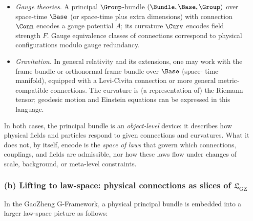 \documentclass[11pt]{book}
\theoremstyle{plain}
\theoremstyle{definition}
\newcommand{\GZLS}{\ensuremath{\mathfrak{L}_{\mathrm{GZ}}}}       \newcommand{\GZLT}{\ensuremath{M_{!w}}}                           \newcommand{\GZLOC}{\ensuremath{A_M}}                             \newcommand{\GZLCurv}{\ensuremath{\mathcal{F}_{\mathrm{law}}}}
\begin{document}
\begin{itemize}
  \item \emph{Gauge theories.}
        A principal $\Group$-bundle $(\Bundle,\Base,\Group)$ over
        space-time $\Base$ (or space-time plus extra dimensions) with
        connection $\Conn$ encodes a gauge potential $A$; its curvature
        $\Curv$ encodes field strength $F$. Gauge equivalence classes
        of connections correspond to physical configurations modulo
        gauge redundancy.
  \item \emph{Gravitation.}
        In general relativity and its extensions, one may work with the
        frame bundle or orthonormal frame bundle over $\Base$ (space-
        time manifold), equipped with a Levi-Civita connection or more
        general metric-compatible connections. The curvature is (a
        representation of) the Riemann tensor; geodesic motion and
        Einstein equations can be expressed in this language.
\end{itemize}

In both cases, the principal bundle is an \emph{object-level} device:
it describes how physical fields and particles respond to given
connections and curvatures. What it does not, by itself, encode is the
\emph{space of laws} that govern which connections, couplings, and
fields are admissible, nor how these laws flow under changes of scale,
background, or meta-level constraints.



\subsubsection*{(b) Lifting to law-space: physical connections as slices of \texorpdfstring{\GZLS}{GZ-LS}}

In the GaoZheng G-Framework, a physical principal bundle is embedded
into a larger law-space picture as follows:
\end{document}
